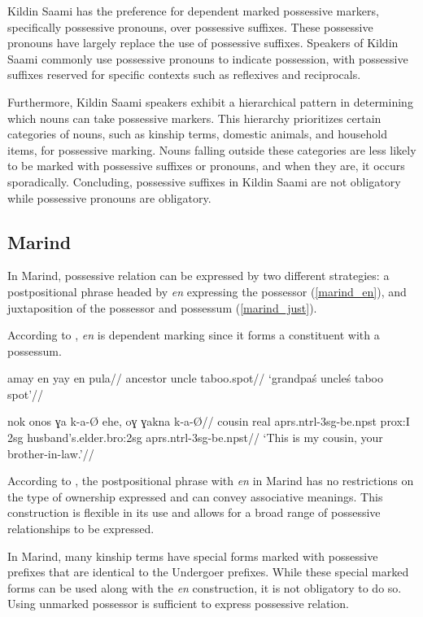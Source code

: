 Kildin Saami has the preference for dependent marked possessive markers, specifically possessive pronouns, over possessive suffixes. These possessive pronouns have largely replace the use of possessive suffixes. Speakers of Kildin Saami commonly use possessive pronouns to indicate possession, with possessive suffixes reserved for specific contexts such as reflexives and reciprocals.

Furthermore, Kildin Saami speakers exhibit a hierarchical pattern in determining which nouns can take possessive markers. This hierarchy prioritizes certain categories of nouns, such as kinship terms, domestic animals, and household items, for possessive marking. Nouns falling outside these categories are less likely to be marked with possessive suffixes or pronouns, and when they are, it occurs sporadically. Concluding, possessive suffixes in Kildin Saami are not obligatory while possessive pronouns are obligatory.

\subsection{Marind}

In Marind, possessive relation can be expressed by two different strategies: a postpositional phrase headed by \textit{en} expressing the possessor (\ref{marind_en}), and juxtaposition of the possessor and possessum (\ref{marind_just}).

According to \citep[158]{olsson2021grammar}, \textit{en} is dependent marking since it forms a constituent with a possessum.

\ex
\label{marind_en}
\begingl
\gla amay en yay en pula//
\glb ancestor \Poss{} uncle \Poss{} taboo.spot//
\glft `grandpa\'s uncle\'s taboo spot'//
\endgl
\xe

\ex
\label{marind_just}
\begingl
\gla nok onos ɣa k-a-Ø ehe, oɣ ɣakna k-a-Ø//
 cousin real aprs.ntrl-3sg-be.npst prox:I 2sg husband's.elder.bro:2sg aprs.ntrl-3sg-be.npst//
\glft `This is my cousin, your brother-in-law.'//
\endgl
\xe

According to \cite{olsson2021grammar}, the postpositional phrase with \textit{en} in Marind has no restrictions on the type of ownership expressed and can convey associative meanings. This construction is flexible in its use and allows for a broad range of possessive relationships to be expressed.

In Marind, many kinship terms have special forms marked with possessive prefixes that are identical to the Undergoer prefixes. While these special marked forms can be used along with the \textit{en} construction, it is not obligatory to do so. Using unmarked possessor is sufficient to express possessive relation.


